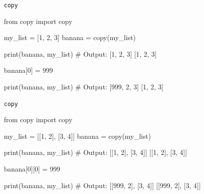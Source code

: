 \begin{frame}[fragile]{\texttt{copy}}

    \begin{pythoncode}

from copy import copy

my_list = [1, 2, 3]
banana = copy(my_list)

print(banana, my_list)
# Output: [1, 2, 3] [1, 2, 3]

banana[0] = 999

print(banana, my_list)
# Output: [999, 2, 3] [1, 2, 3]

    \end{pythoncode}


\end{frame}


\begin{frame}[fragile]{\texttt{copy}}

    \begin{pythoncode}

from copy import copy

my_list = [[1, 2], [3, 4]]
banana = copy(my_list)

print(banana, my_list)
# Output: [[1, 2], [3, 4]] [[1, 2], [3, 4]]

banana[0][0] = 999

print(banana, my_list)
# Output: [[999, 2], [3, 4]] [[999, 2], [3, 4]]

    \end{pythoncode}


\end{frame}


